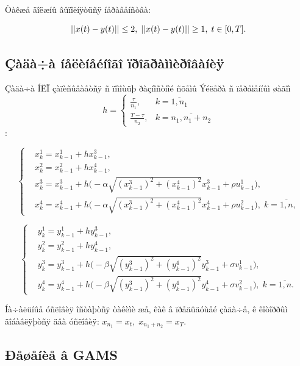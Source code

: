 \documentclass[14pt]{article}
\begin{document}
Òàêæå äîëæíû âûïîëíÿòüñÿ íåðàâåíñòâà:

$$
    ||x(t)-y(t)|| \le 2, \; ||x(t)-y(t)|| \ge 1, \; t \in [0,T]. \\
$$


\subsection{Çàäà÷à íåëèíåéíîãî ïðîãðàììèðîâàíèÿ}

Çàäà÷à ÍËÏ çàïèñûâàåòñÿ ñ ïîìîùüþ ðàçíîñòíîé ñõåìû Ýéëåðà ñ ïåðåìåííûì øàãîì $$h = \begin{cases} \frac{\tau}{n_1}, & k=\overline{1,n_1} \\  \frac{T-\tau}{n_2}, & k=\overline{n_1,n_1+n_2} \end{cases} $$:

\begin{equation}\label{NLP3}
\left\{ \begin{aligned}
& x^1_{k} = x^1_{k-1} + h x^3_{k-1}, \\
& x^2_{k} = x^2_{k-1} + h x^4_{k-1}, \\
& x^3_{k} = x^3_{k-1} + h \Big(-\alpha \sqrt{(x^3_{k-1})^2+(x^4_{k-1})^2} x^3_{k-1} + \rho u^1_{k-1} \Big), \\
& x^4_{k} = x^4_{k-1} + h \Big(-\alpha \sqrt{(x^3_{k-1})^2+(x^4_{k-1})^2} x^4_{k-1} + \rho u^2_{k-1} \Big), \; k = \overline{1,n},
\end{aligned}\right.
\end{equation}

\begin{equation}\label{NLP32}
\left\{ \begin{aligned}
& y^1_{k} = y^1_{k-1} + h y^3_{k-1}, \\
& y^2_{k} = y^2_{k-1} + h y^4_{k-1}, \\
& y^3_{k} = y^3_{k-1} + h \Big(-\beta \sqrt{(y^3_{k-1})^2+(y^4_{k-1})^2} y^3_{k-1} + \sigma v^1_{k-1} \Big), \\
& y^4_{k} = y^4_{k-1} + h \Big(-\beta \sqrt{(y^3_{k-1})^2+(y^4_{k-1})^2} y^4_{k-1} + \sigma v^2_{k-1} \Big), \; k = \overline{1,n}.
\end{aligned}\right.
\end{equation}

Íà÷àëüíûå óñëîâèÿ îñòàþòñÿ òàêèìè æå, êàê â ïðåäûäóùåé çàäà÷å, ê êîòîððûì äîáàâëÿþòñÿ äâà óñëîâèÿ: $x_{n_1} = x_t, \; x_{n_1+n_2} = x_T$.

\subsection{Ðåøåíèå â GAMS}
\end{document}
